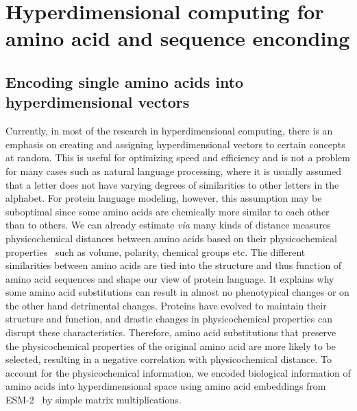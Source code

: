 \chapter{Hyperdimensional computing for amino acid and sequence enconding}
\section{Encoding single amino acids into hyperdimensional vectors}
Currently, in most of the research in hyperdimensional computing, there is an emphasis on creating and assigning hyperdimensional vectors to certain concepts at random. This is useful for optimizing speed and efficiency and is not a problem for many cases such as natural language processing, where it is usually assumed that a letter does not have varying degrees of similarities to other letters in the alphabet. For protein language modeling, however, this assumption may be suboptimal since some amino acids are chemically more similar to each other than to others. We can already estimate \textit{via} many kinds of distance measures physicochemical distances between amino acids based on their physicochemical properties~\cite{physicochem} such as volume, polarity, chemical groups etc. The different similarities between amino acids are tied into the structure and thus function of amino acid sequences and shape our view of protein language. It explains why some amino acid substitutions can result in almost no phenotypical changes or on the other hand detrimental changes. Proteins have evolved to maintain their structure and function, and drastic changes in physicochemical properties can disrupt these characteristics. Therefore, amino acid substitutions that preserve the physicochemical properties of the original amino acid are more likely to be selected, resulting in a negative correlation with physicochemical distance. To account for the physicochemical information, we encoded biological information of amino acids into hyperdimensional space using amino acid embeddings from ESM-2~\cite{esm2} by simple matrix multiplications.

